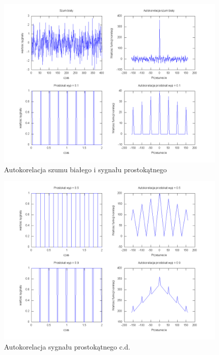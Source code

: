 \documentclass[wide,a4paper,titlepage,12pt]{mwart}
\begin{document}
      \begin{landscape}
        \begin{figure}[htbp]
          \begin{center}
            \includegraphics[scale=.5]{out/Figure2.png}
            \caption{\label{wykres2} Autokorelacja szumu białego i sygnału prostokątnego}
          \end{center}
        \end{figure}
      \end{landscape}

      \begin{landscape}
        \begin{figure}[htbp]
          \begin{center}
            \includegraphics[scale=.5]{out/Figure3.png}
            \caption{\label{wykres3} Autokorelacja sygnału prostokątnego c.d.}
          \end{center}
        \end{figure}
      \end{landscape}
\end{document}
